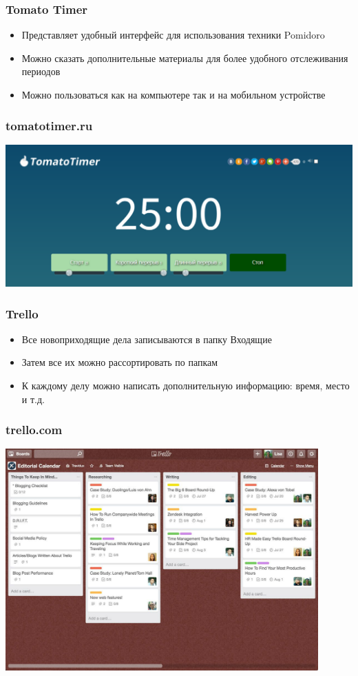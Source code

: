 \documentclass{../industrial-development}
\begin{document}
\begin{frame} \frametitle{Tomato Timer}
  \begin{itemize}
  \item Представляет удобный интерфейс для использования техники Pomidoro
  \item Можно сказать дополнительные материалы для более удобного отслеживания периодов
  \item Можно пользоваться как на компьютере так и на мобильном устройстве
  \end{itemize}
\end{frame}

\begin{frame} \frametitle{tomatotimer.ru}
\centerline{\includegraphics[width=1\textwidth]{tomatotimer.pdf}}
\end{frame}

\begin{frame} \frametitle{Trello}
  \begin{itemize}
  \item Все новоприходящие дела записываются в папку Входящие
  \item Затем все их можно рассортировать по папкам
  \item К каждому делу можно написать дополнительную информацию: время, место и т.д.
  \end{itemize}
\end{frame}

\begin{frame} \frametitle{trello.com}
\centerline{\includegraphics[width=0.9\textwidth]{trello.pdf}}
\end{frame}
\end{document}
